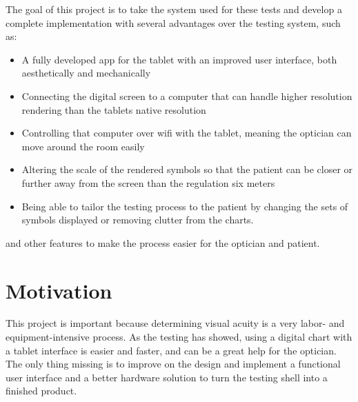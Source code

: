 \documentclass[12pt,a4paper,notitlepage]{report}
\begin{document}
The goal of this project is to take the system used for these tests and develop a complete implementation with several advantages over the testing system, such as:

\begin{itemize}
	\item A fully developed app for the tablet with an improved user interface, both aesthetically and mechanically
	\item Connecting the digital screen to a computer that can handle higher resolution rendering than the tablets native resolution
	\item Controlling that computer over wifi with the tablet, meaning the optician can move around the room easily
	\item Altering the scale of the rendered symbols so that the patient can be closer or further away from the screen than the regulation six meters
	\item Being able to tailor the testing process to the patient by changing the sets of symbols displayed or removing clutter from the charts.
\end{itemize}
	
and other features to make the process easier for the optician and patient.




\section{Motivation}

This project is important because determining visual acuity is a very labor- and equipment-intensive process. As the testing has showed, using a digital chart with a tablet interface is easier and faster, and can be a great help for the optician. The only thing missing is to improve on the design and implement a functional user interface and a better hardware solution to turn the testing shell into a finished product. 

\end{document}
